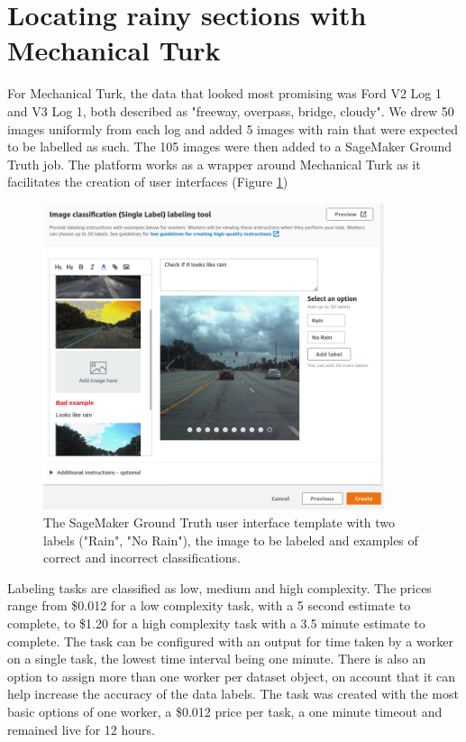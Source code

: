 \section{Locating rainy sections with Mechanical Turk}
For Mechanical Turk, the data that looked most promising was Ford V2 Log 1 and V3 Log 1, both described as "freeway, overpass, bridge, cloudy". We drew 50 images uniformly from each log and added 5 images with rain that were expected to be labelled as such. The 105 images were then added to a SageMaker Ground Truth job. The platform works as a wrapper around Mechanical Turk as it facilitates the creation of user interfaces (Figure \ref{fig:MechTurkCreateJob})
\begin{figure}[h!]
\centering
\includegraphics[width=10cm]{Figures/MechTurkCreateJob.png}
\caption{The SageMaker Ground Truth user interface template with two labels ("Rain", "No Rain"), the image to be labeled and examples of correct and incorrect classifications.}
\label{fig:MechTurkCreateJob}
\end{figure}
Labeling tasks are classified as low, medium and high complexity. The prices range from \$0.012 for a low complexity task, with a 5 second estimate to complete, to \$1.20 for a high complexity task with a 3.5 minute estimate to complete.
The task can be configured with an output for time taken by a worker on a single task, the lowest time interval being one minute.
There is also an option to assign more than one worker per dataset object, on account that it can help increase the accuracy of the data labels.
The task was created with the most basic options of one worker, a \$0.012 price per task, a one minute timeout and remained live for 12 hours. 
